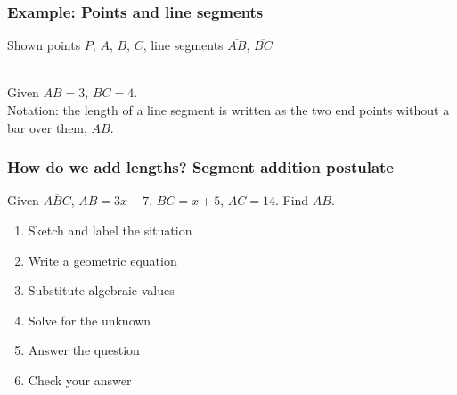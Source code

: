 \documentclass{beamer}
\begin{document}
  \frame
  {
    \frametitle{Example: Points and line segments} \vspace{0.2cm}
    Shown points $P$, $A$, $B$, $C$, line segments $\overline{AB}$, $\overline{BC}$\\[0.15in]
        \\ \vspace{0.5cm}
      Given $AB=3$, $BC=4$.\\[0.5cm]
      Notation: the length of a line segment is written as the two end points without a bar over them, $AB$.
  }

  \frame
  {
    \frametitle{How do we add lengths? Segment addition postulate}
    
    Given $\overline{ABC}$, $AB=3x-7$, $BC=x+5$, $AC=14$. Find ${AB}$.\\[0.5in]
        \vspace{1cm}
  \begin{enumerate}
      \item<2-> Sketch and label the situation\\
      \item<2-> Write a geometric equation\\
      \item<2-> Substitute algebraic values\\
      \item<2-> Solve for the unknown\\
      \item<2-> Answer the question\\
      \item<2-> Check your answer
    \end{enumerate}
  }
\end{document}
